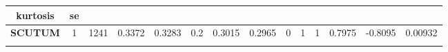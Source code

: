 \begin{longtable}[]{@{}cccccccccccccc@{}}
\begin{minipage}[b]{0.06\columnwidth}
kurtosis\strut
\end{minipage} & \begin{minipage}[b]{0.06\columnwidth}\centering\strut
se\strut
\end{minipage}\tabularnewline
\midrule
\endhead
\begin{minipage}[t]{0.07\columnwidth}\centering\strut
\textbf{SCUTUM}\strut
\end{minipage} & \begin{minipage}[t]{0.04\columnwidth}\centering\strut
1\strut
\end{minipage} & \begin{minipage}[t]{0.04\columnwidth}\centering\strut
1241\strut
\end{minipage} & \begin{minipage}[t]{0.05\columnwidth}\centering\strut
0.3372\strut
\end{minipage} & \begin{minipage}[t]{0.05\columnwidth}\centering\strut
0.3283\strut
\end{minipage} & \begin{minipage}[t]{0.05\columnwidth}\centering\strut
0.2\strut
\end{minipage} & \begin{minipage}[t]{0.05\columnwidth}\centering\strut
0.3015\strut
\end{minipage} & \begin{minipage}[t]{0.05\columnwidth}\centering\strut
0.2965\strut
\end{minipage} & \begin{minipage}[t]{0.03\columnwidth}\centering\strut
0\strut
\end{minipage} & \begin{minipage}[t]{0.03\columnwidth}\centering\strut
1\strut
\end{minipage} & \begin{minipage}[t]{0.04\columnwidth}\centering\strut
1\strut
\end{minipage} & \begin{minipage}[t]{0.05\columnwidth}\centering\strut
0.7975\strut
\end{minipage} & \begin{minipage}[t]{0.06\columnwidth}\centering\strut
-0.8095\strut
\end{minipage} & \begin{minipage}[t]{0.06\columnwidth}\centering\strut
0.00932\strut
\end{minipage}\tabularnewline
\begin{minipage}[t]{0.07\columnwidth}\centering\strut

\end{minipage}
\end{longtable}
